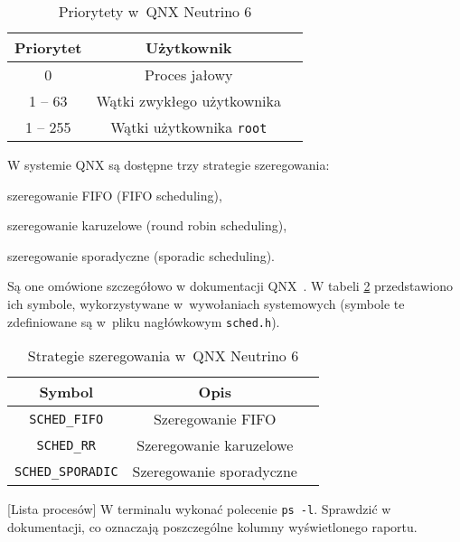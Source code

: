 \begin{table}[h!]
  \centering
  \caption{Priorytety w~QNX Neutrino 6}
  \label{tab:2N6W7}
  \begin{tabular}{|c|c|c|}
    \hline
    \textbf{Priorytet} & \textbf{Użytkownik} \\ \hline
    0 & Proces jałowy \\ \hline
    1 -- 63 & Wątki zwykłego użytkownika \\ \hline
    1 -- 255 & Wątki użytkownika \texttt{root} \\ \hline
  \end{tabular}
\end{table}

W systemie QNX są dostępne trzy strategie szeregowania:
\begin{myitemize}
  \item szeregowanie FIFO (FIFO scheduling),
  \item szeregowanie karuzelowe (round robin scheduling),
  \item szeregowanie sporadyczne (sporadic scheduling).
\end{myitemize}
Są one omówione szczegółowo w dokumentacji QNX~\cite{qnx}. W tabeli
\ref{tab:A9C2X} przedstawiono ich symbole, wykorzystywane w~wywołaniach
systemowych (symbole te zdefiniowane są w~pliku nagłówkowym \texttt{sched.h}).

\begin{table}[h!]
  \centering
  \caption{Strategie szeregowania w~QNX Neutrino 6}
  \label{tab:A9C2X}
  \begin{tabular}{|c|c|c|}
    \hline
    \textbf{Symbol}           & \textbf{Opis} \\ \hline
    \texttt{SCHED\_FIFO}      & Szeregowanie FIFO \\ \hline
    \texttt{SCHED\_RR}        & Szeregowanie karuzelowe \\ \hline
    \texttt{SCHED\_SPORADIC}  & Szeregowanie sporadyczne \\ \hline
  \end{tabular}
\end{table}

\begin{example}{[Lista procesów]}
  \label{ex:TYRDA}
  W terminalu wykonać polecenie \texttt{ps -l}. Sprawdzić w {\color{red}dokumentacji},
  co oznaczają poszczególne kolumny wyświetlonego raportu.
\end{example}

